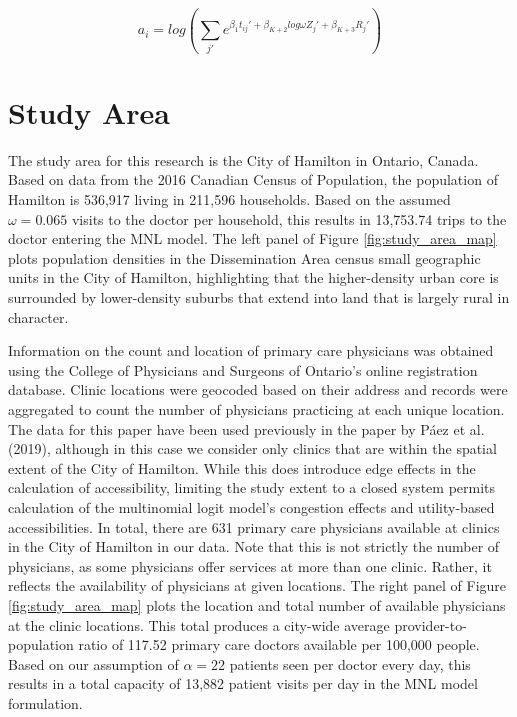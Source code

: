 \documentclass{article}
\begin{document}
\[
a_i = log(\sum_{j\prime} e^{\beta_1 t_{ij}\prime + \beta_{K+2} log \omega Z_j\prime + \beta_{K + 3} R_j\prime})
\]

\hypertarget{study-area}{%
\section{Study Area}\label{study-area}}

The study area for this research is the City of Hamilton in Ontario,
Canada. Based on data from the 2016 Canadian Census of Population, the
population of Hamilton is 536,917 living in 211,596 households. Based on
the assumed \(\omega = 0.065\) visits to the doctor per household, this
results in 13,753.74 trips to the doctor entering the MNL model. The
left panel of Figure \ref{fig:study_area_map} plots population densities
in the Dissemination Area census small geographic units in the City of
Hamilton, highlighting that the higher-density urban core is surrounded
by lower-density suburbs that extend into land that is largely rural in
character.

Information on the count and location of primary care physicians was
obtained using the College of Physicians and Surgeons of Ontario's
online registration database. Clinic locations were geocoded based on
their address and records were aggregated to count the number of
physicians practicing at each unique location. The data for this paper
have been used previously in the paper by Páez et al. (2019), although
in this case we consider only clinics that are within the spatial extent
of the City of Hamilton. While this does introduce edge effects in the
calculation of accessibility, limiting the study extent to a closed
system permits calculation of the multinomial logit model's congestion
effects and utility-based accessibilities. In total, there are 631
primary care physicians available at clinics in the City of Hamilton in
our data. Note that this is not strictly the number of physicians, as
some physicians offer services at more than one clinic. Rather, it
reflects the availability of physicians at given locations. The right
panel of Figure \ref{fig:study_area_map} plots the location and total
number of available physicians at the clinic locations. This total
produces a city-wide average provider-to-population ratio of 117.52
primary care doctors available per 100,000 people. Based on our
assumption of \(\alpha = 22\) patients seen per doctor every day, this
results in a total capacity of 13,882 patient visits per day in the MNL
model formulation.
\end{document}
